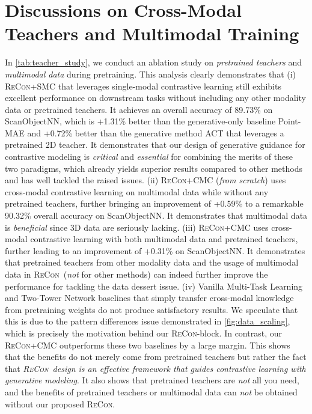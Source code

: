 \documentclass{article}
\theoremstyle{plain}
\theoremstyle{definition}
\theoremstyle{remark}
\def\recon{{\scshape ReCon}}
\begin{document}
\section{Discussions on Cross-Modal Teachers and Multimodal Training}
In \cref{tab:teacher_study}, we conduct an ablation study on \textit{pretrained teachers} and \textit{multimodal data} during pretraining. 
This analysis clearly demonstrates that 
(i) \recon+SMC that leverages single-modal contrastive learning still exhibits excellent performance on downstream tasks without including any other modality data or pretrained teachers. It achieves an overall accuracy of 89.73\% on ScanObjectNN, which is +1.31\% better than the generative-only baseline Point-MAE and +0.72\% better than the generative method ACT that leverages a pretrained 2D teacher. It demonstrates that our design of generative guidance for contrastive modeling is \textit{critical} and \textit{essential} for combining the merits of these two paradigms, which already yields superior results compared to other methods and has well tackled the raised issues. 
(ii) \recon+CMC (\textit{from scratch}) uses cross-modal contrastive learning on multimodal data while without any pretrained teachers, further bringing an improvement of +0.59\% to a remarkable 90.32\% overall accuracy on ScanObjectNN. It demonstrates that multimodal data is \textit{beneficial} since 3D data are seriously lacking.
(iii) \recon+CMC uses cross-modal contrastive learning with both multimodal data and pretrained teachers, further leading to an improvement of +0.31\% on ScanObjectNN. It demonstrates that pretrained teachers from other modality data and the usage of multimodal data in \recon\ (\textit{not} for other methods) can indeed further improve the performance for tackling the data dessert issue.
(iv) Vanilla Multi-Task Learning and Two-Tower Network baselines that simply transfer cross-modal knowledge from pretraining weights do not produce satisfactory results. We speculate that this is due to the pattern differences issue demonstrated in \cref{fig:data_scaling}, which is precisely the motivation behind our \recon-block. In contrast, our \recon+CMC outperforms these two baselines by a large margin. This shows that the benefits do not merely come from pretrained teachers but rather the fact that \textit{\recon\ design is an effective framework that guides contrastive learning with generative modeling}. It also shows that pretrained teachers are \textit{not} all you need, and the benefits of pretrained teachers or multimodal data can \textit{not} be obtained without our proposed \recon.
\end{document}

